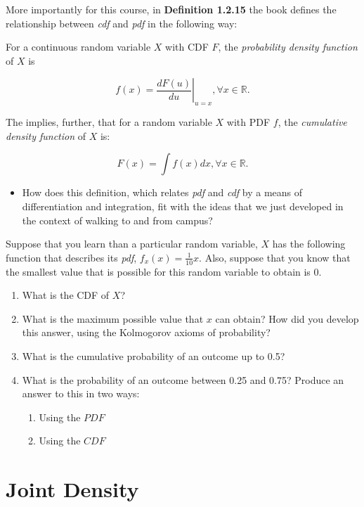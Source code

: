 \documentclass[
  letterpaper,
  DIV=11,
  numbers=noendperiod]{scrreprt}
\providecommand{\tightlist}{%
  \setlength{\itemsep}{0pt}\setlength{\parskip}{0pt}}\usepackage{longtable,booktabs,array}
\begin{document}
More importantly for this course, in \textbf{Definition 1.2.15} the book
defines the relationship between \emph{cdf} and \emph{pdf} in the
following way:

For a continuous random variable \(X\) with CDF \(F\), the
\emph{probability density function} of \(X\) is

\[
  f(x) = \left. \frac{d F(u)}{du} \right|_{u=x}, \forall x \in \mathbb{R}.
\]

The implies, further, that for a random variable \(X\) with PDF \(f\),
the \emph{cumulative density function} of \(X\) is:

\[
F(x) = \int f(x) dx, \forall x \in \mathbb{R}. 
\]

\begin{itemize}
\tightlist
\item
  How does this definition, which relates \emph{pdf} and \emph{cdf} by a
  means of differentiation and integration, fit with the ideas that we
  just developed in the context of walking to and from campus?
\end{itemize}

Suppose that you learn than a particular random variable, \(X\) has the
following function that describes its \emph{pdf},
\(f_{x}(x) = \frac{1}{10}x\). Also, suppose that you know that the
smallest value that is possible for this random variable to obtain is 0.

\begin{enumerate}
\def\labelenumi{\arabic{enumi}.}
\tightlist
\item
  What is the CDF of \(X\)?
\item
  What is the maximum possible value that \(x\) can obtain? How did you
  develop this answer, using the Kolmogorov axioms of probability?
\item
  What is the cumulative probability of an outcome up to 0.5?
\item
  What is the probability of an outcome between 0.25 and 0.75? Produce
  an answer to this in two ways:

  \begin{enumerate}
  \def\labelenumii{\arabic{enumii}.}
  \tightlist
  \item
    Using the \(PDF\)
  \item
    Using the \(CDF\)
  \end{enumerate}
\end{enumerate}

\section{Joint Density}\label{joint-density}
\end{document}
